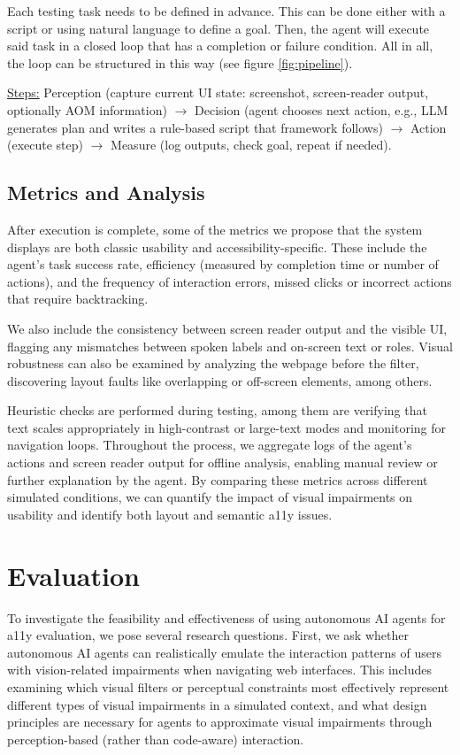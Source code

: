 Each testing task needs to be defined in advance. This can be done either with a script or using natural language to define a goal. Then, the agent will execute said task in a closed loop that has a completion or failure condition. All in all, the loop can be structured in this way (see figure \ref{fig:pipeline}).

\underline{Steps:} Perception (capture current \ac{UI} state: screenshot, screen-reader output, optionally \ac{AOM} information) $\rightarrow$ Decision (agent chooses next action, e.g., LLM generates plan and writes a rule-based script that framework follows) $\rightarrow$ Action (execute step) $\rightarrow$ Measure (log outputs, check goal, repeat if needed).


\subsection{Metrics and Analysis}

After execution is complete, some of the metrics we propose that the system displays are both classic usability and accessibility-specific. These include the agent's task success rate, efficiency (measured by completion time or number of actions), and the frequency of interaction errors, missed clicks or incorrect actions that require backtracking. 

We also include the consistency between screen reader output and the visible \ac{UI}, flagging any mismatches between spoken labels and on-screen text or roles. Visual robustness can also be examined by analyzing the webpage before the filter, discovering layout faults like overlapping or off-screen elements, among others. 

Heuristic checks are performed during testing, among them are verifying that text scales appropriately in high-contrast or large-text modes and monitoring for navigation loops. Throughout the process, we aggregate logs of the agent's actions and screen reader output for offline analysis, enabling manual review or further explanation by the agent. By comparing these metrics across different simulated conditions, we can quantify the impact of visual impairments on usability and identify both layout and semantic \ac{a11y} issues.

\section{Evaluation}

To investigate the feasibility and effectiveness of using autonomous AI agents for \ac{a11y} evaluation, we pose several research questions. First, we ask whether autonomous AI agents can realistically emulate the interaction patterns of users with vision-related impairments when navigating web interfaces. This includes examining which visual filters or perceptual constraints most effectively represent different types of visual impairments in a simulated context, and what design principles are necessary for agents to approximate visual impairments through perception-based (rather than code-aware) interaction.

